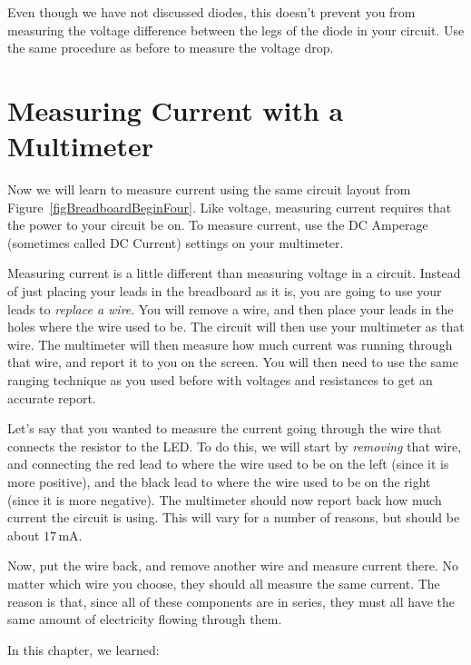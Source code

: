 Even though we have not discussed diodes, this doesn't prevent you from measuring the voltage difference between the legs of the diode in your circuit.
Use the same procedure as before to measure the voltage drop.

\section{Measuring Current with a Multimeter}

Now we will learn to measure current using the same circuit layout from Figure~\ref{figBreadboardBeginFour}.
Like voltage, measuring current requires that the power to your circuit be on.
To measure current, use the DC Amperage (sometimes called DC Current) settings on your multimeter.

Measuring current is a little different than measuring voltage in a circuit.
Instead of just placing your leads in the breadboard as it is, you are going to use your leads to \emph{replace a wire}.
You will remove a wire, and then place your leads in the holes where the wire used to be.
The circuit will then use your multimeter as that wire.
The multimeter will then measure how much current was running through that wire, and report it to you on the screen.
You will then need to use the same ranging technique as you used before with voltages and resistances to get an accurate report.

Let's say that you wanted to measure the current going through the wire that connects the resistor to the LED.
To do this, we will start by \emph{removing} that wire, and connecting the red lead to where the wire used to be on the left (since it is more positive), and the black lead to where the wire used to be on the right (since it is more negative).
The multimeter should now report back how much current the circuit is using.  
This will vary for a number of reasons, but should be about $17\,\si{\milli\ampere}$.

Now, put the wire back, and remove another wire and measure current there.
No matter which wire you choose, they should all measure the same current.
The reason is that, since all of these components are in series, they must all have the same amount of electricity flowing through them.

\reviewsection

In this chapter, we learned:


